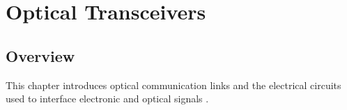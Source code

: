 \chapter{Optical Transceivers}

\section{Overview}

This chapter introduces optical communication links and the
electrical circuits used to interface electronic and optical
signals
\citep{palermo2025ecen720}.





